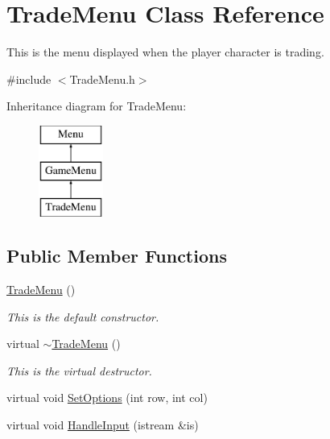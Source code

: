 \hypertarget{classTradeMenu}{\section{Trade\-Menu Class Reference}
\label{classTradeMenu}
}


This is the menu displayed when the player character is trading.  




{\ttfamily \#include $<$Trade\-Menu.\-h$>$}

Inheritance diagram for Trade\-Menu\-:\begin{figure}[H]
\begin{center}
\leavevmode
\includegraphics[height=3.000000cm]{classTradeMenu}
\end{center}
\end{figure}
\subsection*{Public Member Functions}
\begin{DoxyCompactItemize}
\item 
\hypertarget{classTradeMenu_a3b09de2db8d3b7a1f88fe9b62fe7b4ec}{\hyperlink{classTradeMenu_a3b09de2db8d3b7a1f88fe9b62fe7b4ec}{Trade\-Menu} ()}\label{classTradeMenu_a3b09de2db8d3b7a1f88fe9b62fe7b4ec}

\begin{DoxyCompactList}\small\item\em This is the default constructor. \end{DoxyCompactList}\item 
\hypertarget{classTradeMenu_ac2cf70176a9ad343276dcaa6a4917e99}{virtual \hyperlink{classTradeMenu_ac2cf70176a9ad343276dcaa6a4917e99}{$\sim$\-Trade\-Menu} ()}\label{classTradeMenu_ac2cf70176a9ad343276dcaa6a4917e99}

\begin{DoxyCompactList}\small\item\em This is the virtual destructor. \end{DoxyCompactList}\item 
virtual void \hyperlink{classTradeMenu_a19108bce8db49ad92d3427ad3894a075}{Set\-Options} (int row, int col)
\item 
virtual void \hyperlink{classTradeMenu_a367004a0b1ceccd4517de8dea1e1d210}{Handle\-Input} (istream \&is)
\end{DoxyCompactItemize}
